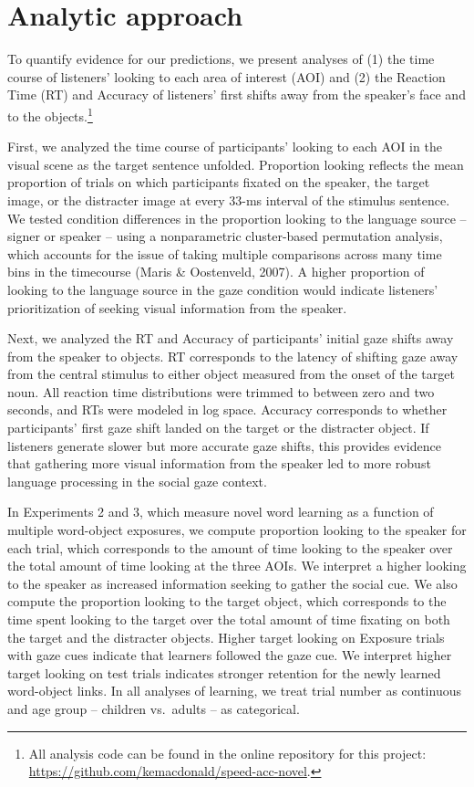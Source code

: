 \documentclass[man,floatsintext]{apa6}
\let\rmarkdownfootnote\footnote%
\def\footnote{\protect\rmarkdownfootnote}
\begin{document}
\section{Analytic approach}\label{analytic-approach}

To quantify evidence for our predictions, we present analyses of (1) the
time course of listeners' looking to each area of interest (AOI) and (2)
the Reaction Time (RT) and Accuracy of listeners' first shifts away from
the speaker's face and to the objects.\footnote{All analysis code can be
  found in the online repository for this project:
  \url{https://github.com/kemacdonald/speed-acc-novel}.}

First, we analyzed the time course of participants' looking to each AOI
in the visual scene as the target sentence unfolded. Proportion looking
reflects the mean proportion of trials on which participants fixated on
the speaker, the target image, or the distracter image at every 33-ms
interval of the stimulus sentence. We tested condition differences in
the proportion looking to the language source -- signer or speaker --
using a nonparametric cluster-based permutation analysis, which accounts
for the issue of taking multiple comparisons across many time bins in
the timecourse (Maris \& Oostenveld, 2007). A higher proportion of
looking to the language source in the gaze condition would indicate
listeners' prioritization of seeking visual information from the
speaker.

Next, we analyzed the RT and Accuracy of participants' initial gaze
shifts away from the speaker to objects. RT corresponds to the latency
of shifting gaze away from the central stimulus to either object
measured from the onset of the target noun. All reaction time
distributions were trimmed to between zero and two seconds, and RTs were
modeled in log space. Accuracy corresponds to whether participants'
first gaze shift landed on the target or the distracter object. If
listeners generate slower but more accurate gaze shifts, this provides
evidence that gathering more visual information from the speaker led to
more robust language processing in the social gaze context.

In Experiments 2 and 3, which measure novel word learning as a function
of multiple word-object exposures, we compute proportion looking to the
speaker for each trial, which corresponds to the amount of time looking
to the speaker over the total amount of time looking at the three AOIs.
We interpret a higher looking to the speaker as increased information
seeking to gather the social cue. We also compute the proportion looking
to the target object, which corresponds to the time spent looking to the
target over the total amount of time fixating on both the target and the
distracter objects. Higher target looking on Exposure trials with gaze
cues indicate that learners followed the gaze cue. We interpret higher
target looking on test trials indicates stronger retention for the newly
learned word-object links. In all analyses of learning, we treat trial
number as continuous and age group -- children vs.~adults -- as
categorical.
\end{document}
